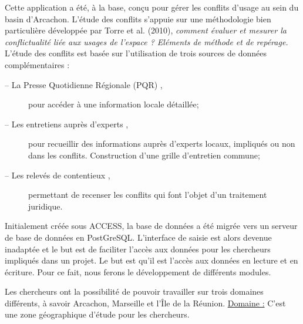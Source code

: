 \documentclass[12pt,a4paper]{article}
\begin{document}
Cette application a été, à la base, conçu pour gérer les conflits d'usage au sein du basin d'Arcachon. L’étude des conflits s’appuie sur une méthodologie bien particulière développée par Torre et al. (2010), \emph{comment évaluer et mesurer la conflictualité liée aux usages de l'espace ? Eléments de méthode et de repérage.} \newline \newline
L'étude des conflits est basée sur l’utilisation de trois sources de données complémentaires :
\begin{description}
\item[–	La Presse Quotidienne Régionale  (PQR) ,] pour accéder à une information locale détaillée;
\item[–	Les entretiens auprès d’experts ,] pour recueillir des informations auprès d’experts locaux, impliqués ou non dans les conflits. Construction d’une grille d’entretien commune; 
\item[–	Les relevés de contentieux ,] permettant de recenser les conflits qui font l’objet d’un  traitement juridique. \newline
\end{description}


Initialement créée sous ACCESS, la base de données a été migrée vers un serveur de base de données en PostGreSQL. L’interface de saisie est alors devenue inadaptée et le but est de faciliter l’accès aux données pour les chercheurs impliqués dans un projet. Le but est qu'il est l'accès aux données en lecture et en écriture. Pour ce fait, nous ferons le développement de différents modules. \newline \newline

Les chercheurs ont la possibilité de pouvoir travailler sur trois domaines différents, à savoir Arcachon, Marseille et l'Île de la Réunion.\newline
\underline{Domaine :} C'est une zone géographique d'étude pour les chercheurs.
\end{document}
